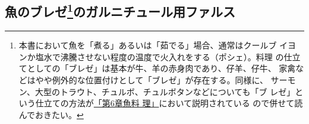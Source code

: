 \hypertarget{farces-speciales-pour-garnir-les-poissons-braises}{%
\subsection[魚のブレゼのガルニチュール用ファルス]{\texorpdfstring{魚のブレゼ\footnote{本書において魚を「煮る」あるいは「茹でる」場合、通常はクールブ
  イヨンか塩水で沸騰させない程度の温度で火入れをする（ポシェ）。料理
  の仕立てとしての「ブレゼ」は基本が牛、羊の赤身肉であり、仔羊、仔牛、
  家禽などはやや例外的な位置付けとして「ブレゼ」が存在する。同様に、
  サーモン、大型のトラウト、チュルボ、チュルボタンなどについても「ブ
  レゼ」という仕立ての方法が\protect\hyperlink{cuisson-des-poissons-par-le-braisage}{「第6章魚料
  理」}において説明されている ので併せて読んでおきたい。}のガルニチュール用ファルス}{魚のブレゼのガルニチュール用ファルス}}\label{farces-speciales-pour-garnir-les-poissons-braises}}

